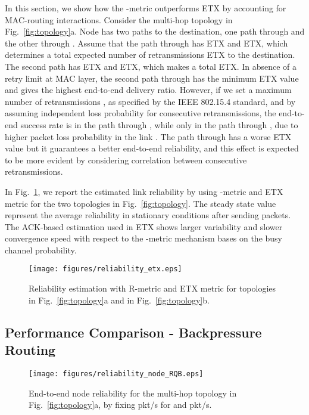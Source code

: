\documentclass[review, 1p, 11pt]{elsarticle}
\numberwithin{equation}{section}
\begin{document}
In this section, we show how the -metric outperforms ETX by accounting for MAC-routing interactions.
Consider the multi-hop topology in Fig.~\ref{fig:topology}a. Node  has two paths to the destination, one path through  and the other through . Assume that the path through  has ETX and ETX, which determines a total expected number of retransmissions ETX to the destination. The second path has ETX and ETX, which makes a total ETX.
In absence of a retry limit at MAC layer, the second path through  has the minimum ETX value and gives the highest end-to-end delivery ratio. However, if we set a maximum number of retransmissions , as specified by the IEEE 802.15.4 standard, and by assuming independent loss probability for consecutive retransmissions, the end-to-end success rate is  in the path through , while only  in the path through , due to higher packet loss probability in the link . The path through  has a  worse ETX value but it guarantees a  better end-to-end reliability, and this effect is expected to be more evident by considering correlation between consecutive retransmissions.

In Fig.~\ref{fig:estimation}, we report the estimated link reliability by using -metric  and ETX metric for the two topologies in Fig.~\ref{fig:topology}.
The steady state value represent the average reliability in stationary conditions after sending  packets.
The ACK-based estimation used in ETX shows larger variability and slower convergence speed with respect to the -metric mechanism bases on the busy channel probability.


\begin{figure}\centering
  \texttt{[image: figures/reliability\_etx.eps]}
  \caption{Reliability estimation with R-metric and ETX metric for topologies in Fig.~\ref{fig:topology}a and in Fig.~\ref{fig:topology}b.}\label{fig:estimation}
\end{figure}





\subsection{Performance Comparison - Backpressure Routing}



\begin{figure}[h] \centering
\texttt{[image: figures/reliability\_node\_RQB.eps]}
\caption{End-to-end node reliability for the multi-hop
topology in Fig.~\ref{fig:topology}a, by fixing  pkt/s for  and  pkt/s.\label{fig:mh_rel_node}}
\end{figure}
\end{document}
